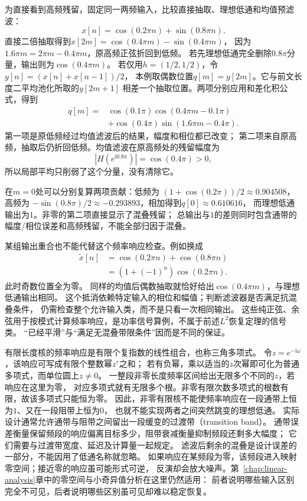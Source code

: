 为直接看到高频残留，固定同一两频输入，比较直接抽取、理想低通和均值预滤波：
\[
  x[n]=\cos(0.2\pi n)+\sin(0.8\pi n).
\]
直接二倍抽取得到$x[2m]=\cos(0.4\pi m)-\sin(0.4\pi m)$，
因为$1.6\pi m=2\pi m-0.4\pi m$，原高频正弦折回到低频。
若先理想低通完全删除$0.8\pi$分量，输出则为$\cos(0.4\pi m)$。
若仅用$h=(1/2,1/2)$，令$y[n]=(x[n]+x[n-1])/2$，
本例取偶数位置$q[m]=y[2m]$。它与前文长度二平均池化所取的$y[2m+1]$
相差一个抽取位置。两项分别应用和差化积公式，得到
\[
 \begin{aligned}
  q[m]={}&\cos(0.1\pi)\cos(0.4\pi m-0.1\pi)\\
        &+\cos(0.4\pi)\sin(1.6\pi m-0.4\pi).
 \end{aligned}
\]
第一项是原低频经过均值滤波后的结果，幅度和相位都已改变；
第二项来自原高频，抽取后仍折回低频。均值滤波在原高频处的残留幅度为
\[
 |H(e^{\mathrm i0.8\pi})|=\cos(0.4\pi)>0,
\]
所以局部平均只削弱了这个分量，没有清除它。

在$m=0$处可以分别复算两项贡献：低频为
$(1+\cos(0.2\pi))/2\approx0.904508$，高频为
$-\sin(0.8\pi)/2\approx-0.293893$，相加得到$q[0]\approx0.610616$，
而理想低通输出为$1$。非零的第二项直接显示了混叠残留；
总输出与$1$的差则同时包含通带的幅度/相位误差和高频残留，不能全部归因于混叠。

某组输出重合也不能代替这个频率响应检查。例如换成
\[
 \begin{aligned}
  \widetilde x[n]&=\cos(0.2\pi n)+\cos(0.8\pi n)\\
                 &=(1+(-1)^n)\cos(0.2\pi n).
 \end{aligned}
\]
此时奇数位置全为零。
同样的均值后偶数抽取就恰好给出$\cos(0.4\pi m)$，与理想低通输出相同。
这个抵消依赖特定输入的相位和幅值；判断滤波器是否满足抗混叠条件，
仍需检查整个允许输入类，而不是只看一次相同输出。
这些纯正弦、余弦用于按模式计算频率响应，是功率信号算例，不属于前述$L^2$恢复定理的信号类。
“已经平滑”与“满足无混叠带限条件”因而是不同的保证。

有限长度核的频率响应是有限个复指数的线性组合，也称三角多项式。
令$z=e^{-\mathrm i\omega}$，该响应可写成有限个整数幂$z^r$之和；
若有负幂，乘以适当的$z$次幂即可化为普通多项式，而单位圆上$z\neq0$。
一整段非零长度频率区间给出无限多个不同的$z$，若响应在这里为零，
对应多项式就有无限多个根。非零有限次数多项式的根数有限，故该多项式只能恒为零。
因此，非零有限核不能使频率响应在一段通带上恒为$1$、又在一段阻带上恒为$0$，
也就不能实现两者之间突然跳变的理想低通。
实际设计通常允许通带与阻带之间留出一段缓变的过渡带（transition band）。
通带误差衡量保留频段的响应偏离目标多少，阻带衰减衡量抑制频段还剩多大幅度；
它们需要与过渡带宽度、延迟及计算量一起规定。
滤波后剩余的混叠是设计误差的一部分，不能因用了低通名称就忽略。
如果响应在某频段为零，该频段进入映射零空间；接近零的响应虽可能形式可逆，
反演却会放大噪声。第~\ref{chap:linear-analysis}章中的零空间与小奇异值分析在这里仍然适用：
前者说明哪些输入区别完全不可见，后者说明哪些区别虽可见却难以稳定恢复。

